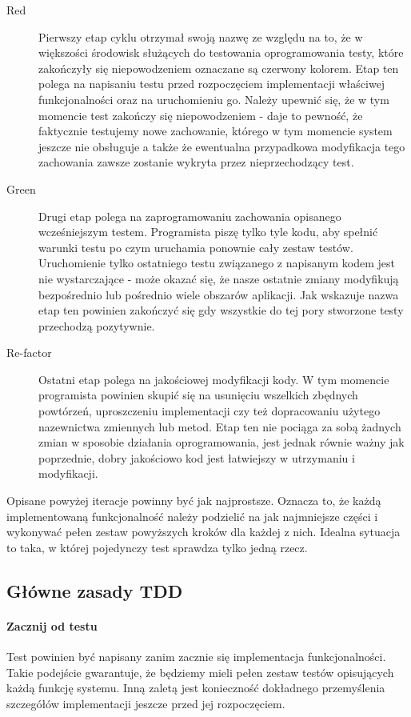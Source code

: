     \begin{description}
      \item[Red] Pierwszy etap cyklu otrzymał swoją nazwę ze względu na to, że w większości środowisk służących do testowania oprogramowania testy, które zakończyły się niepowodzeniem oznaczane są czerwony kolorem. Etap ten polega na napisaniu testu przed rozpoczęciem implementacji właściwej funkcjonalności oraz na uruchomieniu go. Należy upewnić się, że w tym momencie test zakończy się niepowodzeniem - daje to pewność, że faktycznie testujemy nowe zachowanie, którego w tym momencie system jeszcze nie obsługuje a także że ewentualna przypadkowa modyfikacja tego zachowania zawsze zostanie wykryta przez nieprzechodzący test.
      \item[Green] Drugi etap polega na zaprogramowaniu zachowania opisanego wcześniejszym testem. Programista piszę tylko tyle kodu, aby spełnić warunki testu po czym uruchamia ponownie cały zestaw testów. Uruchomienie tylko ostatniego testu związanego z napisanym kodem jest nie wystarczające - może okazać się, że nasze ostatnie zmiany modyfikują bezpośrednio lub pośrednio wiele obszarów aplikacji. Jak wskazuje nazwa etap ten powinien zakończyć się gdy wszystkie do tej pory stworzone testy przechodzą pozytywnie.
      \item[Re-factor] Ostatni etap polega na jakościowej modyfikacji kody. W tym momencie programista powinien skupić się na usunięciu wszelkich zbędnych powtórzeń, uproszczeniu implementacji czy też dopracowaniu użytego nazewnictwa zmiennych lub metod. Etap ten nie pociąga za sobą żadnych zmian w sposobie działania oprogramowania, jest jednak równie ważny jak poprzednie, dobry jakościowo kod jest łatwiejszy w utrzymaniu i modyfikacji.
    \end{description}
    
    Opisane powyżej iteracje powinny być jak najprostsze. Oznacza to, że każdą implementowaną funkcjonalność należy podzielić na jak najmniejsze części i wykonywać pełen zestaw powyższych kroków dla każdej z nich. Idealna sytuacja to taka, w której pojedynczy test sprawdza tylko jedną rzecz.

  \subsection{Główne zasady TDD}
    \paragraph{Zacznij od testu}
      Test powinien być napisany zanim zacznie się implementacja funkcjonalności. Takie podejście gwarantuje, że będziemy mieli pełen zestaw testów opisujących każdą funkcję systemu. Inną zaletą jest konieczność dokładnego przemyślenia szczegółów implementacji jeszcze przed jej rozpoczęciem.
